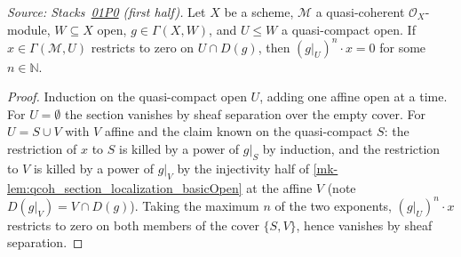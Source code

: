 \begin{lemma}
  \label{mk-lem:qcqs_section_localization_torsion}
  \leanok

  \textit{Source: Stacks~\href{https://stacks.math.columbia.edu/tag/01P0}{01P0}
  (first half).}
  Let $X$ be a scheme, $\mathcal{M}$ a quasi-coherent $\mathcal{O}_X$-module,
  $W \subseteq X$ open, $g \in \Gamma(X, W)$, and $U \le W$ a quasi-compact
  open. If $x \in \Gamma(\mathcal{M}, U)$ restricts to zero on
  $U \cap D(g)$, then $(g|_U)^n \cdot x = 0$ for some $n \in \mathbb{N}$.
\end{lemma}
\begin{proof}
  \leanok
  Induction on the quasi-compact open $U$, adding one affine open at a time.
  For $U = \emptyset$ the section vanishes by sheaf separation over the empty
  cover. For $U = S \cup V$ with $V$ affine and the claim known on the
  quasi-compact $S$: the restriction of $x$ to $S$ is killed by a power of
  $g|_S$ by induction, and the restriction to $V$ is killed by a power of
  $g|_V$ by the injectivity half of
  \ref{mk-lem:qcoh_section_localization_basicOpen} at the affine $V$ (note
  $D(g|_V) = V \cap D(g)$). Taking the maximum $n$ of the two exponents,
  $(g|_U)^n \cdot x$ restricts to zero on both members of the cover
  $\{S, V\}$, hence vanishes by sheaf separation.
\end{proof}

